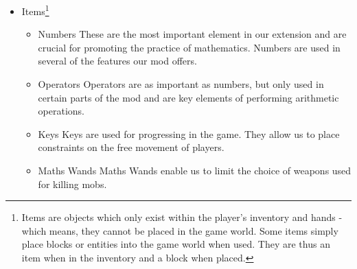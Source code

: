 \begin{itemize}
\item \huge Items\large \footnote{Items are objects which only exist within the player's inventory and hands - which means, they cannot be placed in the game world. Some items simply place blocks or entities into the game world when used. They are thus an item when in the inventory and a block when placed.\cite{website:minecraft-item}}

\begin{itemize}

\Large \item Numbers
\newline
\normalsize These are the most important element in our extension and are crucial for promoting the practice of mathematics. Numbers are used in several of the features our mod offers.
\newline

\Large \item Operators
\newline
\normalsize Operators are as important as numbers, but only used in certain parts of the mod and are key elements of performing arithmetic operations.
\newline

\Large \item Keys
\newline
\normalsize Keys are used for progressing in the game. They allow us to place constraints on the free movement of players.
\newline

\Large \item Maths Wands
\newline
\normalsize Maths Wands enable us to limit the choice of weapons used for killing mobs.
\newline

\end{itemize}

\end{itemize}
